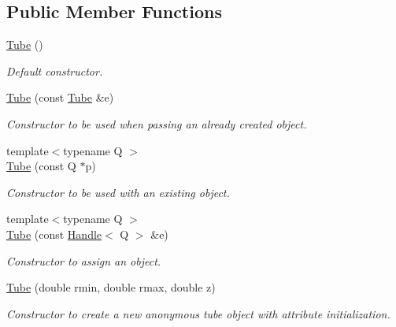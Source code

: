 \subsection*{Public Member Functions}
\begin{DoxyCompactItemize}
\item 
\hyperlink{class_d_d4hep_1_1_geometry_1_1_tube_af19332dbaf81aacd17bd47daebf3753f}{Tube} ()
\begin{DoxyCompactList}\small\item\em Default constructor. \item\end{DoxyCompactList}\item 
\hyperlink{class_d_d4hep_1_1_geometry_1_1_tube_a9124113381205107d88062a5c9ae6673}{Tube} (const \hyperlink{class_d_d4hep_1_1_geometry_1_1_tube}{Tube} \&e)
\begin{DoxyCompactList}\small\item\em Constructor to be used when passing an already created object. \item\end{DoxyCompactList}\item 
{\footnotesize template$<$typename Q $>$ }\\\hyperlink{class_d_d4hep_1_1_geometry_1_1_tube_a98cdd89204ddf996eee964d580005dd9}{Tube} (const Q $\ast$p)
\begin{DoxyCompactList}\small\item\em Constructor to be used with an existing object. \item\end{DoxyCompactList}\item 
{\footnotesize template$<$typename Q $>$ }\\\hyperlink{class_d_d4hep_1_1_geometry_1_1_tube_ac665edcfb3f8294d2fbea28777b7ab4b}{Tube} (const \hyperlink{class_d_d4hep_1_1_handle}{Handle}$<$ Q $>$ \&e)
\begin{DoxyCompactList}\small\item\em Constructor to assign an object. \item\end{DoxyCompactList}\item 
\hyperlink{class_d_d4hep_1_1_geometry_1_1_tube_a8c7646c72431590ee08498dccd5db2cf}{Tube} (double rmin, double rmax, double z)
\begin{DoxyCompactList}\small\item\em Constructor to create a new anonymous tube object with attribute initialization. \item\end{DoxyCompactList}\item 

\end{DoxyCompactItemize}
